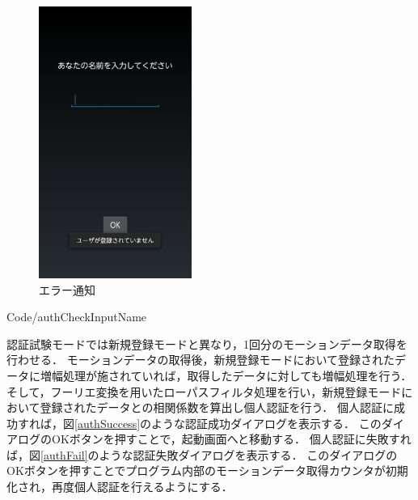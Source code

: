 \documentclass[11pt]{jreport}
\renewcommand{\slash}{/}
\begin{document}
\begin{figure}[htbp]
            \begin{minipage}{0.33\hsize}
                \begin{center}
                    \includegraphics[width=5cm, bb=0 0 540 960]{AuthNameInputError.pdf}
                \end{center}
                \caption{エラー通知}
                \label{authNameInputError}
            \end{minipage}
        \end{figure}

        \newpage
        
        {Code\slash authCheckInputName}

        認証試験モードでは新規登録モードと異なり，1回分のモーションデータ取得を行わせる．
        モーションデータの取得後，新規登録モードにおいて登録されたデータに増幅処理が施されていれば，取得したデータに対しても増幅処理を行う．
        そして，フーリエ変換を用いたローパスフィルタ処理を行い，新規登録モードにおいて登録されたデータとの相関係数を算出し個人認証を行う．
        個人認証に成功すれば，図\ref{authSuccess}のような認証成功ダイアログを表示する．
        このダイアログのOKボタンを押すことで，起動画面へと移動する．
        個人認証に失敗すれば，図\ref{authFail}のような認証失敗ダイアログを表示する．
        このダイアログのOKボタンを押すことでプログラム内部のモーションデータ取得カウンタが初期化され，再度個人認証を行えるようにする．
\end{document}
